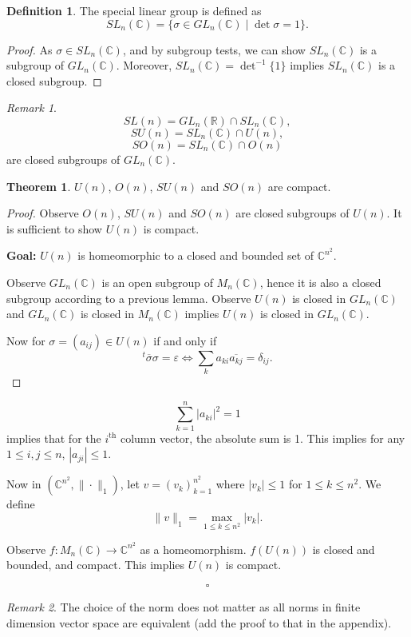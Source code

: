 \documentclass[11pt]{article}
\theoremstyle{definition}
\newtheorem{definition}{Definition}[section]
\newtheorem{theorem}{Theorem}[section]
\theoremstyle{remark}
\newtheorem{remark}{Remark}[section]
\begin{document}
\begin{definition}\label{def:special_linear_group}
The special linear group is defined as
\[
SL_n(\mathbb{C}) = \{\sigma \in GL_n(\mathbb{C}) \mid \det \sigma = 1\}.
\]
\end{definition}

\begin{proof}
As $\sigma \in SL_n(\mathbb{C})$, and by subgroup tests, we can show $SL_n(\mathbb{C})$ is a subgroup of $GL_n(\mathbb{C})$. Moreover, $SL_n(\mathbb{C}) = \det^{-1}\{1\}$ implies $SL_n(\mathbb{C})$ is a closed subgroup.
\end{proof}

\begin{remark}\label{rem:closed_subgroups}
\[
SL(n) = GL_n(\mathbb{R}) \cap SL_n(\mathbb{C}),
\]
\[
SU(n) = SL_n(\mathbb{C}) \cap U(n),
\]
\[
SO(n) = SL_n(\mathbb{C}) \cap O(n)
\]
are closed subgroups of $GL_n(\mathbb{C})$.
\end{remark}

\begin{theorem}\label{thm:compact_classical_groups}
$U(n)$, $O(n)$, $SU(n)$ and $SO(n)$ are compact.
\end{theorem}

\begin{proof}
Observe $O(n)$, $SU(n)$ and $SO(n)$ are closed subgroups of $U(n)$. It is sufficient to show $U(n)$ is compact.

\textbf{Goal:} $U(n)$ is homeomorphic to a closed and bounded set of $\mathbb{C}^{n^2}$.

Observe $GL_n(\mathbb{C})$ is an open subgroup of $M_n(\mathbb{C})$, hence it is also a closed subgroup according to a previous lemma. Observe $U(n)$ is closed in $GL_n(\mathbb{C})$ and $GL_n(\mathbb{C})$ is closed in $M_n(\mathbb{C})$ implies $U(n)$ is closed in $GL_n(\mathbb{C})$.

Now for $\sigma = (a_{ij}) \in U(n)$ if and only if
\[
^t \overline{\sigma} \sigma = \varepsilon \iff \sum_{k} a_{ki} \overline{a_{kj}} = \delta_{ij}.
\]
\end{proof}

\[
\sum_{k=1}^n |a_{ki}|^2 = 1
\]
implies that for the $i^{\text{th}}$ column vector, the absolute sum is 1. This implies for any $1 \leq i, j \leq n$, $|a_{ji}| \leq 1$.

Now in $(\mathbb{C}^{n^2}, \|\cdot\|_1)$, let $v = (v_k)_{k=1}^{n^2}$ where $|v_k| \leq 1$ for $1 \leq k \leq n^2$. We define
\[
\|v\|_1 = \max_{1 \leq k \leq n^2} |v_k|.
\]

Observe $f: M_n(\mathbb{C}) \to \mathbb{C}^{n^2}$ as a homeomorphism. $f(U(n))$ is closed and bounded, and compact. This implies $U(n)$ is compact.

\[
\square
\]

\begin{remark}
The choice of the norm does not matter as all norms in finite dimension vector space are equivalent (add the proof to that in the appendix).
\end{remark}
\end{document}

